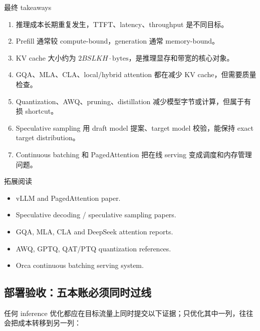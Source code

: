 \documentclass[a4paper]{article}
\begin{document}
\begin{importantbox}{最终 takeaways}
\begin{enumerate}
    \item 推理成本长期重复发生，TTFT、latency、throughput 是不同目标。
    \item Prefill 通常较 compute-bound，generation 通常 memory-bound。
    \item KV cache 大小约为 \(2BSLKH\cdot\text{bytes}\)，是推理显存和带宽的核心对象。
    \item GQA、MLA、CLA、local/hybrid attention 都在减少 KV cache，但需要质量检查。
    \item Quantization、AWQ、pruning、distillation 减少模型字节或计算，但属于有损 shortcut。
    \item Speculative sampling 用 draft model 提案、target model 校验，能保持 exact target distribution。
    \item Continuous batching 和 PagedAttention 把在线 serving 变成调度和内存管理问题。
\end{enumerate}
\end{importantbox}

\begin{knowledgebox}{拓展阅读}
\begin{itemize}
    \item vLLM and PagedAttention paper.
    \item Speculative decoding / speculative sampling papers.
    \item GQA, MLA, CLA and DeepSeek attention reports.
    \item AWQ, GPTQ, QAT/PTQ quantization references.
    \item Orca continuous batching serving system.
\end{itemize}
\end{knowledgebox}

\subsection{部署验收：五本账必须同时过线}

任何 inference 优化都应在目标流量上同时提交以下证据；只优化其中一列，往往会把成本转移到另一列：
\end{document}
